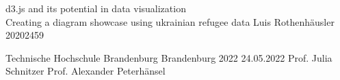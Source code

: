 \newcommand{\THBTitle}[9]{

  \thispagestyle{empty}
  \vspace*{\stretch{1}}
  {\parindent0cm
  \rule{\linewidth}{.7ex}}
  \begin{flushright}
    \vspace*{\stretch{1}}
    \sffamily\bfseries\Huge
    #1\\
    \vspace*{\stretch{1}}
    \sffamily\bfseries\large
    #2\\
    \vspace*{\stretch{1}}
    \sffamily\bfseries\small
    #3
  \end{flushright}
  \rule{\linewidth}{.7ex}

  \vspace*{\stretch{1}}
  \begin{center}
    \texttt{[image: figs/2015\_10\_05\_THB\_FB-IM\_Logo\_RGB]} \\
    \vspace*{\stretch{1}}
    \Large  Bachelorarbeit\\

    \vspace*{\stretch{2}}
   \large Fachbereich Informatik\\
    \large und Medien\\
    \large Technische Hochschule Brandenburg\\
    \vspace*{\stretch{1}}
    \large Betreuer:  #8 \\[1mm]
    \large 2. Betreuer:  #9 \\[1mm]
    
    \vspace*{\stretch{1}}
    \large Brandenburg, den #7 \\
        \vspace*{\stretch{0.25}}

    Bearbeitungszeit: 07.07.2022 - 01.09.2022 %

  \end{center}
}

\THBTitle
      {d3.js and its potential in data visualization\\
      \large Creating a diagram showcase using ukrainian refugee data}        %
      {Luis Rothenh\"ausler}                        %
      {20202459}
      
      {Technische Hochschule Brandenburg}  %
      {Brandenburg 2022}                          %
      {24.05.2022}                              %
      {Prof. Julia Schnitzer}               %
      {Prof. Alexander Peterhänsel}                          %